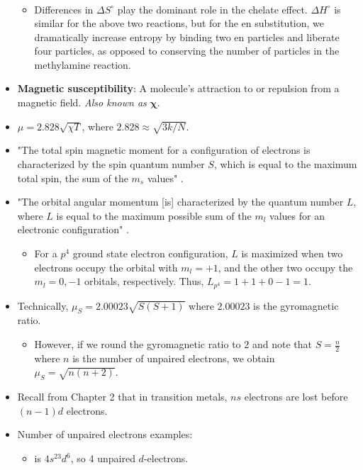 \documentclass[../notes.tex]{subfiles}
\begin{document}
\begin{itemize}
\begin{gather*}
    \end{gather*}
    \begin{itemize}
        \item Differences in $\Delta S^\circ$ play the dominant role in the chelate effect. $\Delta H^\circ$ is similar for the above two reactions, but for the en substitution, we dramatically increase entropy by binding two en particles and liberate four  particles, as opposed to conserving the number of particles in the methylamine reaction.
    \end{itemize}
    \item \textbf{Magnetic susceptibility}: A molecule's attraction to or repulsion from a magnetic field. \emph{Also known as} $\bm{\chi}$.
    \item $\mu=2.828\sqrt{\chi T}$, where $2.828\approx\sqrt{3k/N}$.
    \item "The total spin magnetic moment for a configuration of electrons is characterized by the spin quantum number $S$, which is equal to the maximum total spin, the sum of the $m_s$ values" \parencite[360]{bib:MiesslerFischerTarr}.
    \item "The orbital angular momentum [is] characterized by the quantum number $L$, where $L$ is equal to the maximum possible sum of the $m_l$ values for an electronic configuration" \parencite[360]{bib:MiesslerFischerTarr}.
    \begin{itemize}
        \item For a $p^4$ ground state electron configuration, $L$ is maximized when two electrons occupy the orbital with $m_l=+1$, and the other two occupy the $m_l=0,-1$ orbitals, respectively. Thus, $L_{p^4}=1+1+0-1=1$.
    \end{itemize}
    \item Technically, $\mu_S=2.00023\sqrt{S(S+1)}$ where $2.00023$ is the gyromagnetic ratio.
    \begin{itemize}
        \item However, if we round the gyromagnetic ratio to 2 and note that $S=\frac{n}{2}$ where $n$ is the number of unpaired electrons, we obtain $\mu_S=\sqrt{n(n+2)}$.
    \end{itemize}
    \item Recall from Chapter 2 that in transition metals, $ns$ electrons are lost before $(n-1)d$ electrons.
    \item Number of unpaired electrons examples:
    \begin{itemize}
        \item {} is $4s^23d^6$, so 4 unpaired $d$-electrons.

\end{itemize}
\end{itemize}
\end{document}
